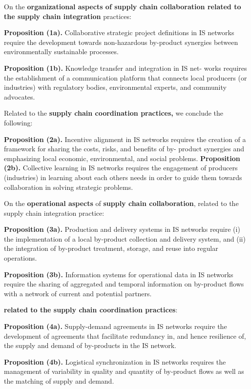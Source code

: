 On the \textbf{organizational aspects of supply chain collaboration related to the supply chain integration} practices:\par
\textbf{Proposition (1a).} Collaborative strategic project definitions in IS networks require the development towards non-hazardous by-product synergies between environmentally sustainable processes.\par
\textbf{Proposition (1b).} Knowledge transfer and integration in IS net- works requires the establishment of a communication platform that connects local producers (or industries) with regulatory bodies, environmental experts, and community advocates.\par
Related to the \textbf{supply chain coordination practices,} we conclude the following:\par
\textbf{Proposition (2a).} Incentive alignment in IS networks requires the creation of a framework for sharing the costs, risks, and benefits of by- product synergies and emphasizing local economic, environmental, and social problems. \PAR 
\textbf{Proposition (2b).} Collective learning in IS networks requires the engagement of producers (industries) in learning about each others needs in order to guide them towards collaboration in solving strategic problems.\par
On the \textbf{operational aspects} of \textbf{supply chain collaboration}, related to the supply chain integration practice: \par
\textbf{Proposition (3a).} Production and delivery systems in IS networks require (i) the implementation of a local by-product collection and delivery system, and (ii) the integration of by-product treatment, storage, and reuse into regular operations.\par
\textbf{Proposition (3b). }Information systems for operational data in IS networks require the sharing of aggregated and temporal information on by-product flows with a network of current and potential partners.\par
\textbf{related to the supply chain coordination practices}:\par
\textbf{Proposition (4a).} Supply-demand agreements in IS networks require the development of agreements that facilitate redundancy in, and hence resilience of, the supply and demand of by-products in the IS network.\par
\textbf{Proposition (4b).} Logistical synchronization in IS networks requires the management of variability in quality and quantity of by-product flows as well as the matching of supply and demand.


